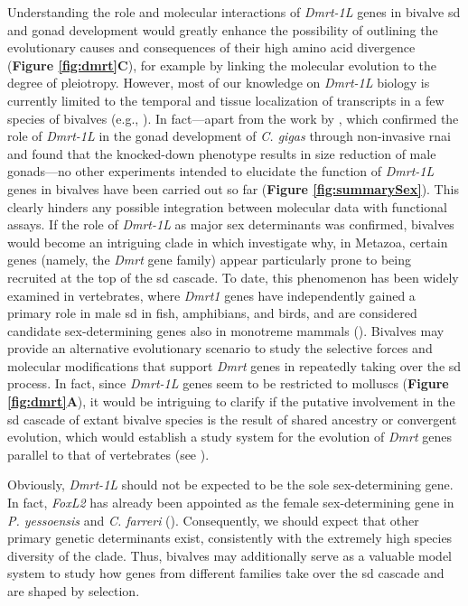 \documentclass[../main.tex]{subfiles}
\begin{document}
Understanding the role and molecular interactions of \textit{Dmrt-1L} genes in bivalve \gls{sd} and gonad development would greatly enhance the possibility of outlining the evolutionary causes and consequences of their high amino acid divergence (\textbf{Figure \ref{fig:dmrt}C}), for example by linking the molecular evolution to the degree of pleiotropy. However, most of our knowledge on \textit{Dmrt-1L} biology is currently limited to the temporal and tissue localization of transcripts in a few species of bivalves (e.g., \textbf{\cite{li2018foxl2,yue2021variance}}). In fact—apart from the work by \textbf{\cite{sun2022examination}}, which confirmed the role of \textit{Dmrt-1L} in the gonad development of \textit{C. gigas} through non-invasive \gls{rnai} and found that the knocked-down phenotype results in size reduction of male gonads—no other experiments intended to elucidate the function of \textit{Dmrt-1L} genes in bivalves have been carried out so far (\textbf{Figure \ref{fig:summarySex}}). This clearly hinders any possible integration between molecular data with functional assays.
If the role of \textit{Dmrt-1L} as major sex determinants was confirmed, bivalves would become an intriguing clade in which investigate why, in Metazoa, certain genes (namely, the \textit{Dmrt} gene family) appear particularly prone to being recruited at the top of the \gls{sd} cascade. To date, this phenomenon has been widely examined in vertebrates, where \textit{Dmrt1} genes have independently gained a primary role in male \gls{sd} in fish, amphibians, and birds, and are considered candidate sex-determining genes also in monotreme mammals (\textbf{\cite{marshall2010homologies,beukeboom2014evolution,mawaribuchi2019independent}}). Bivalves may provide an alternative evolutionary scenario to study the selective forces and molecular modifications that support \textit{Dmrt} genes in repeatedly taking over the \gls{sd} process. In fact, since \textit{Dmrt-1L} genes seem to be restricted to molluscs (\textbf{Figure \ref{fig:dmrt}A}), it would be intriguing to clarify if the putative involvement in the \gls{sd} cascade of extant bivalve species is the result of shared ancestry or convergent evolution, which would establish a study system for the evolution of \textit{Dmrt} genes parallel to that of vertebrates (see \textbf{\cite{capel2017vertebrate}}).

Obviously, \textit{Dmrt-1L} should not be expected to be the sole sex-determining gene. In fact, \textit{FoxL2} has already been appointed as the female sex-determining gene in \textit{P. yessoensis} and \textit{C. farreri} (\textbf{\cite{han2022ancient}}). Consequently, we should expect that other primary genetic determinants exist, consistently with the extremely high species diversity of the clade. Thus, bivalves may additionally serve as a valuable model system to study how genes from different families take over the \gls{sd} cascade and are shaped by selection.
\end{document}
